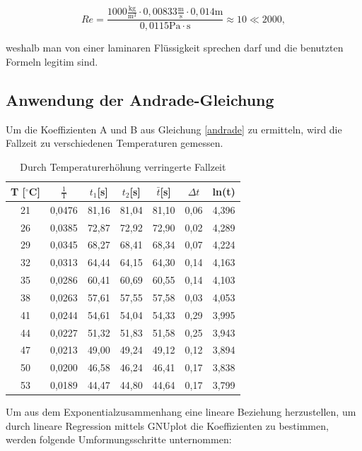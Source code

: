 \begin{equation}
 Re = \frac{1000\frac{\text{kg}}{\text{m}^3} \cdot 0,00833\frac{\text{m}}{\text{s}} \cdot 0,014 \text{m}}{0,0115 \text{Pa}\cdot\text{s}} \approx 10 \ll 2000,
\end{equation}

weshalb man von einer laminaren Flüssigkeit sprechen darf und die benutzten Formeln legitim sind.

\subsection{Anwendung der Andrade-Gleichung}
Um die Koeffizienten A und B aus Gleichung \eqref{andrade} zu ermitteln, wird die Fallzeit zu verschiedenen Temperaturen gemessen.

\renewcommand{\arraystretch}{1.2}
\begin{table}
 \begin{tabular}{c|c|c|c|c|c|c}
   T [$^\circ$C] & $\frac{1}{\text{T}}$& $t_1$[s] & $t_2$[s] & $\bar t$[s] & $\Delta t$ & ln(t)\\	
   \hline
21&	0,0476&	81,16&	81,04&	81,10&	0,06&	4,396\\
26&	0,0385&	72,87&	72,92&	72,90&	0,02&	4,289\\
29&	0,0345&	68,27&	68,41&	68,34&	0,07&	4,224\\
32&	0,0313&	64,44&	64,15&	64,30&	0,14&	4,163\\
35&	0,0286&	60,41&	60,69&	60,55&	0,14&	4,103\\
38&	0,0263&	57,61&	57,55&	57,58&	0,03&	4,053\\
41&	0,0244&	54,61&	54,04&	54,33&	0,29&	3,995\\
44&	0,0227&	51,32&	51,83&	51,58&	0,25&	3,943\\
47&	0,0213&	49,00&	49,24&	49,12&	0,12&	3,894\\
50&	0,0200&	46,58&	46,24&	46,41&	0,17&	3,838\\
53&	0,0189&	44,47&	44,80&	44,64&	0,17&	3,799\\


 \end{tabular}
\caption{Durch Temperaturerhöhung verringerte Fallzeit}
\end{table}
\renewcommand{\arraystretch}{1}

Um aus dem Exponentialzusammenhang eine lineare Beziehung herzustellen, um durch lineare Regression mittels GNUplot
die Koeffizienten zu bestimmen,
werden folgende Umformungsschritte unternommen:

